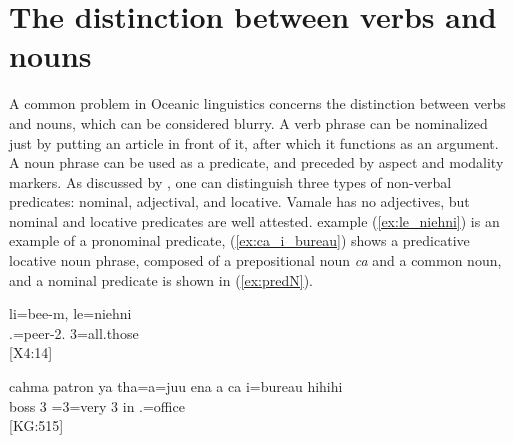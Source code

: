 %	
%	
%	
%	

\section{The distinction between verbs and nouns}
A common problem in Oceanic linguistics concerns the distinction between verbs and nouns, which can be considered blurry. A verb phrase can be nominalized just by putting an article in front of it, after which it functions as an argument. A noun phrase can be used as a predicate, and preceded by aspect and modality markers. As discussed by \textcite[3]{creissels_non-verbal_}, one can distinguish three types of non-verbal predicates: nominal, adjectival, and locative. Vamale has no adjectives, but nominal and locative predicates are well attested. example (\ref{ex:le_niehni}) is an example of a pronominal predicate, (\ref{ex:ca_i_bureau}) shows a predicative locative noun phrase, composed of a prepositional noun \textit{ca}  and a common noun, and a nominal predicate is shown in (\ref{ex:predN}). 


\ea\label{ex:le_niehni}
\gll li=bee-m, le=niehni\\
 .=peer-2. 3=all.those\\
\glt {} {[}X4:14]
\z



\ea\label{ex:ca_i_bureau}
\gll cahma patron ya tha=a=juu ena a ca i=bureau hihihi\\
  boss 3 =3=very  3 in .=office \\
\glt {} {[}KG:515]
\z


